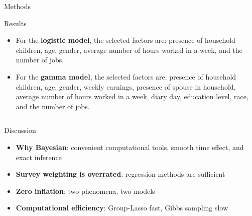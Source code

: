\documentclass[final]{beamer}
\newcounter{acolumn}%
\def\autoheight{\vspace*{0pt}}%
\begin{document}
\begin{frame}
\begin{acolumns}[t]
\begin{column}{.24\linewidth}
\begin{block}{Methods}
                     
     \end{block}
          
          
     \begin{block}{Results}
        \begin{itemize}
        	\item For the \textbf{logistic model}, the selected factors are: presence of household children, age, gender, average number of hours worked in a week, and the number of jobs.
        	
        	\item For the \textbf{gamma model}, the selected factors are: presence of household children, age, gender, weekly earnings, presence of spouse in household, average number of hours worked in a week, diary day, education level, race, and the number of jobs.
        \end{itemize}
       \autoheight                   
     \end{block}
     
        
    \end{column}
    
    
    \end{acolumns}
    
    \vfill
    
        \begin{acolumns}[t]
        
        \begin{column}{.24\linewidth}
        		
                 
                 \begin{block}{Discussion}
                 	\begin{itemize}
                 		\item \textbf{Why Bayesian}: convenient computational tools, smooth time effect, and exact inference
                 		
                 		\item \textbf{Survey weighting is overrated}: regression methods are sufficient
                 		
                 		\item \textbf{Zero inflation}: two phenomena, two models
                 		
                 		\item \textbf{Computational efficiency}: Group-Lasso fast, Gibbs sampling slow
                 	\end{itemize}
                  \autoheight   
                 \end{block}
                              

\end{column}
\end{acolumns}
\end{frame}
\end{document}
